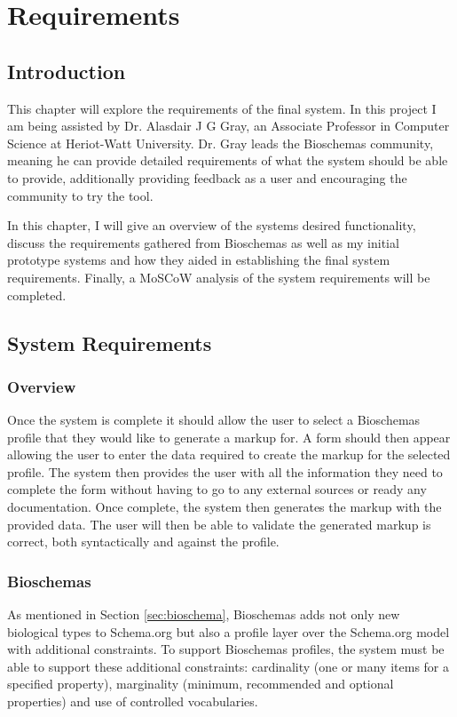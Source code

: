
\chapter{Requirements} 
{

\section{Introduction}
This chapter will explore the requirements of the final system. In this project I am being assisted by Dr. Alasdair J G Gray, an Associate Professor in Computer Science at Heriot-Watt University. Dr. Gray leads the Bioschemas community, meaning he can provide detailed requirements of what the system should be able to provide, additionally providing feedback as a user and encouraging the community to try the tool. \par

In this chapter, I will give an overview of the systems desired functionality, discuss the requirements gathered from Bioschemas as well as my initial prototype systems and how they aided in establishing the final system requirements. Finally, a MoSCoW analysis of the system requirements will be completed. 

\section{System Requirements}
\subsection{Overview}
Once the system is complete it should allow the user to select a Bioschemas profile that they would like to generate a markup for. A form should then appear allowing the user to enter the data required to create the markup for the selected profile. The system then provides the user with all the information they need to complete the form without having to go to any external sources or ready any documentation. Once complete, the system then generates the markup with the provided data. The user will then be able to validate the generated markup is correct, both syntactically and against the profile.

}

\subsection{Bioschemas}
\label{sec:bioschemaRequirements}
As mentioned in Section \ref{sec:bioschema}, Bioschemas adds not only new biological types to Schema.org but also a profile layer over the Schema.org model with additional constraints. To support Bioschemas profiles, the system must be able to support these additional constraints: cardinality (one or many items for a specified property), marginality (minimum, recommended and optional properties) and use of controlled vocabularies. 

